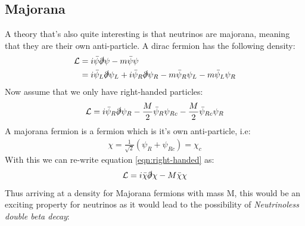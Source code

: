 \documentclass[11pt,a4paper,faculty=we,language=en,doctype=report]{cls/ugent-doc}
\begin{document}
\subsection{Majorana}
A theory that's also quite interesting is that
neutrinos are majorana, meaning that they are their own anti-particle.
A dirac fermion has the following density:
\begin{align}
  \mathcal{L} &= i\bar{\psi}\slashed{\partial}\psi - m\bar{\psi}\psi\\
              &= i\bar{\psi}_L\slashed{\partial}\psi_L + i\bar{\psi}_R\slashed{\partial}\psi_R - m\bar{\psi}_R\psi_L - m\bar{\psi}_L\psi_R
\end{align}
Now assume that we only have right-handed particles:
\begin{equation}
  \mathcal{L} = i\bar{\psi}_R\slashed{\partial}\psi_R - \frac{M}{2}\bar{\psi}_R\psi_{Rc} - \frac{M}{2}\bar{\psi}_{Rc}\psi_R
\label{eqn:right-handed}
\end{equation}
A majorana fermion is a fermion which is it's own anti-particle, i.e:
\begin{align}
  \chi = \frac{1}{\sqrt{2}}\left( \psi_R + \psi_{Rc}  \right) = \chi_c
\end{align}
With this we can re-write equation \ref{eqn:right-handed} as:
\begin{equation}
  \mathcal{L} = i\bar{\chi}\slashed{\partial}\chi - M \bar{\chi}\chi
\end{equation}
Thus arriving at a density for Majorana fermions with mass M, this would be an exciting property
for neutrinos as it would lead to the possibility of
\textit{Neutrinoless double beta decay}:
\end{document}
